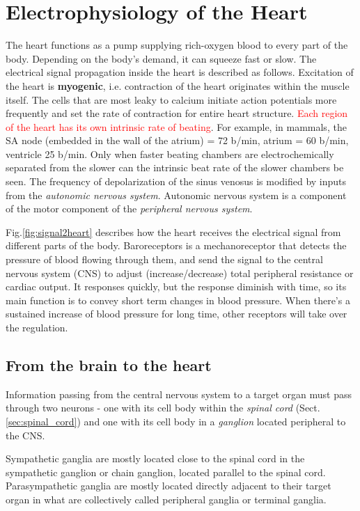 \chapter{Electrophysiology of the Heart}


The heart functions as a pump supplying rich-oxygen blood to every part of the
body. Depending on the body's demand, it can squeeze fast or slow.
The electrical signal propagation inside the heart is described as follows.
Excitation of the heart is {\bf myogenic}, i.e. contraction of the heart
originates within the muscle itself. The cells that are most leaky to calcium
initiate action potentials more frequently and set the rate of contraction for
entire heart structure. \textcolor{red}{Each region of the heart has its own
intrinsic rate of beating}.  For example, in mammals, the SA node (embedded in
the wall of the atrium) = 72 b/min, atrium = 60 b/min, ventricle 25 b/min.  Only
when faster  beating chambers are electrochemically separated from the slower
can the  intrinsic beat rate of the slower chambers be seen.   
The frequency of depolarization of the sinus venosus is modified by inputs from
the {\it autonomic nervous system}. Autonomic nervous system is a component of
the motor component of the {\it peripheral nervous system}.  


Fig.\ref{fig:signal2heart} describes how the heart receives the electrical
signal from different parts of the body. Baroreceptors is a mechanoreceptor that
detects the pressure of blood flowing through them, and send the signal to the
central nervous system (CNS) to adjust (increase/decrease) total peripheral
resistance or cardiac output. It responses quickly, but the response diminish
with time, so its main function is to convey short term changes in blood
pressure. When there's a sustained increase of blood pressure for long time,
other receptors will take over the regulation. 

\section{From the brain to the heart}
\label{sec:brain-to-heart-connection}

Information passing from the central nervous system to a target organ must pass
through two neurons - one with its cell body within the {\it spinal cord}
(Sect.\ref{sec:spinal_cord}) and one with its cell body in a {\it ganglion}
located peripheral to the CNS.

Sympathetic ganglia are mostly located close to the spinal cord in the
sympathetic ganglion or chain ganglion, located parallel to the spinal cord.
Parasympathetic ganglia are mostly located directly adjacent to their target
organ in what are collectively called peripheral ganglia or terminal ganglia.

